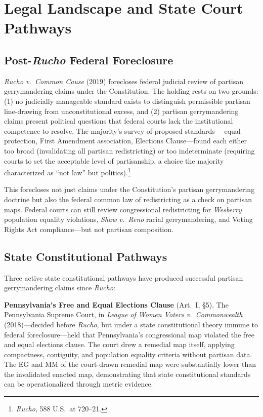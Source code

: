 \section{Legal Landscape and State Court Pathways}
\label{sec:legal}

\subsection{Post-\textit{Rucho} Federal Foreclosure}

\textit{Rucho v.\ Common Cause} (2019) forecloses federal judicial review of
partisan gerrymandering claims under the Constitution. The holding rests on
two grounds: (1) no judicially manageable standard exists to distinguish
permissible partisan line-drawing from unconstitutional excess, and (2) partisan
gerrymandering claims present political questions that federal courts lack the
institutional competence to resolve. The majority's survey of proposed standards---
equal protection, First Amendment association, Elections Clause---found each
either too broad (invalidating all partisan redistricting) or too indeterminate
(requiring courts to set the acceptable level of partisanship, a choice the
majority characterized as ``not law'' but politics).\footnote{\textit{Rucho},
588 U.S.\ at 720--21.}

This forecloses not just claims under the Constitution's partisan gerrymandering
doctrine but also the federal common law of redistricting as a check on partisan
maps. Federal courts can still review congressional redistricting for
\textit{Wesberry} population equality violations, \textit{Shaw v.\ Reno} racial
gerrymandering, and Voting Rights Act compliance---but not partisan composition.

\subsection{State Constitutional Pathways}

Three active state constitutional pathways have produced successful partisan
gerrymandering claims since \textit{Rucho}:

\textbf{Pennsylvania's Free and Equal Elections Clause} (Art.\ I, \S 5). The
Pennsylvania Supreme Court, in \textit{League of Women Voters v.\ Commonwealth}
(2018)---decided before \textit{Rucho}, but under a state constitutional theory
immune to federal foreclosure---held that Pennsylvania's congressional map
violated the free and equal elections clause. The court drew a remedial map
itself, applying compactness, contiguity, and population equality criteria without
partisan data. The EG and MM of the court-drawn remedial map were substantially
lower than the invalidated enacted map, demonstrating that state constitutional
standards can be operationalized through metric evidence.

